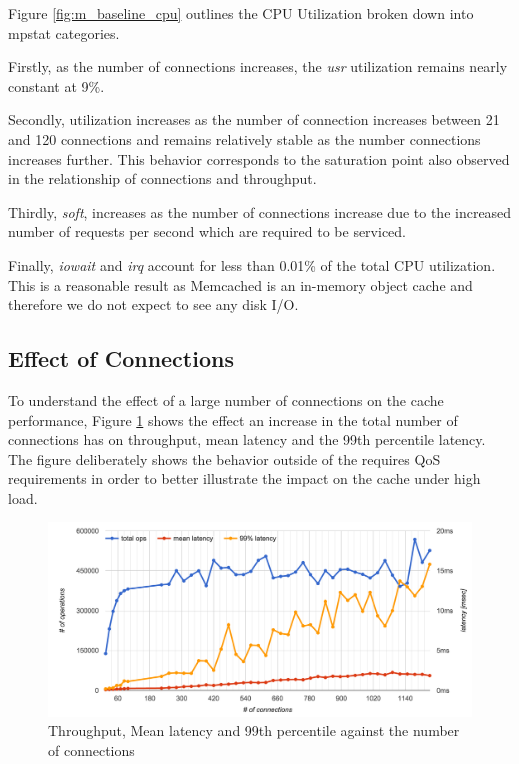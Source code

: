 Figure \ref{fig:m_baseline_cpu} outlines the CPU Utilization broken down into mpstat categories.

Firstly, as the number of connections increases, the \textit{usr} utilization remains nearly constant at 9\%.

Secondly,  utilization increases as the number of connection increases between 21 and 120 connections and remains relatively stable as the number connections increases further. This behavior corresponds to the saturation point also observed in the relationship of connections and throughput.

Thirdly, \textit{soft}, increases as the number of connections increase due to the increased number of requests per second which are required to be serviced.

Finally, \textit{iowait} and \textit{irq} account for less than 0.01\% of the total CPU utilization. This is a reasonable result as Memcached is an in-memory object cache and therefore we do not expect to see any disk I/O.












\subsection{Effect of Connections}
To understand the effect of a large number of connections on the cache performance, Figure \ref{fig:memcached-default_connections} shows the effect an increase in the total number of connections has on throughput, mean latency and the 99th percentile latency. The figure deliberately shows the behavior outside of the requires QoS requirements in order to better illustrate the impact on the cache under high load.

\begin{figure}[h]
    \includegraphics[width=\textwidth]{./res/5_default_connections.png}
    \caption{Throughput, Mean latency and 99th percentile against the number of connections}
    \label{fig:memcached-default_connections}
\end{figure}

